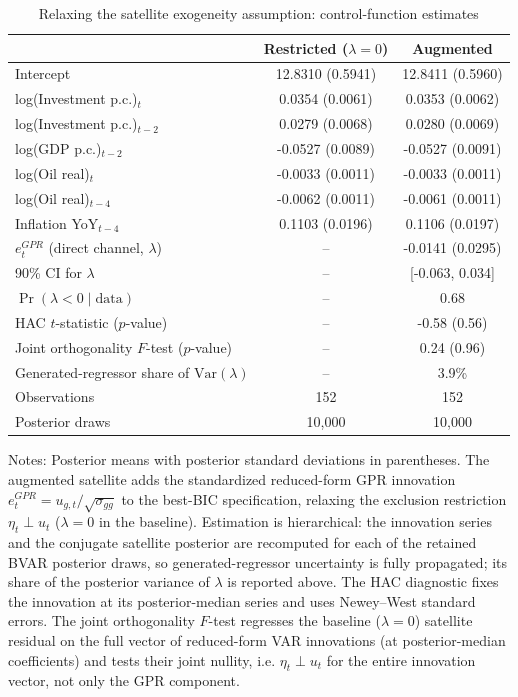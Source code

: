 \begin{table}[!htbp]
\centering
\caption{Relaxing the satellite exogeneity assumption: control-function estimates}
\label{tab:direct_channel_satellite}
\begin{tabular}{lcc}
\toprule
 & Restricted ($\lambda = 0$) & Augmented \\
\midrule
Intercept & 12.8310 (0.5941) & 12.8411 (0.5960) \\
log(Investment p.c.)$_{t}$ & 0.0354 (0.0061) & 0.0353 (0.0062) \\
log(Investment p.c.)$_{t-2}$ & 0.0279 (0.0068) & 0.0280 (0.0069) \\
log(GDP p.c.)$_{t-2}$ & -0.0527 (0.0089) & -0.0527 (0.0091) \\
log(Oil real)$_{t}$ & -0.0033 (0.0011) & -0.0033 (0.0011) \\
log(Oil real)$_{t-4}$ & -0.0062 (0.0011) & -0.0061 (0.0011) \\
Inflation YoY$_{t-4}$ & 0.1103 (0.0196) & 0.1106 (0.0197) \\
$e^{GPR}_{t}$ (direct channel, $\lambda$) & -- & -0.0141 (0.0295) \\
\midrule
90\% CI for $\lambda$ & -- & [-0.063, 0.034] \\
$\Pr(\lambda < 0 \mid \text{data})$ & -- & 0.68 \\
HAC $t$-statistic ($p$-value) & -- & -0.58 (0.56) \\
Joint orthogonality $F$-test ($p$-value) & -- & 0.24 (0.96) \\
Generated-regressor share of $\mathrm{Var}(\lambda)$ & -- & 3.9\% \\
Observations & 152 & 152 \\
Posterior draws & 10,000 & 10,000 \\
\bottomrule
\end{tabular}
\begin{tablenotes}
\small
\item Notes: Posterior means with posterior standard deviations in parentheses. The augmented satellite adds the standardized reduced-form GPR innovation $e^{GPR}_t = u_{g,t}/\sqrt{\sigma_{gg}}$ to the best-BIC specification, relaxing the exclusion restriction $\eta_t \perp u_t$ ($\lambda = 0$ in the baseline). Estimation is hierarchical: the innovation series and the conjugate satellite posterior are recomputed for each of the retained BVAR posterior draws, so generated-regressor uncertainty is fully propagated; its share of the posterior variance of $\lambda$ is reported above. The HAC diagnostic fixes the innovation at its posterior-median series and uses Newey--West standard errors. The joint orthogonality $F$-test regresses the baseline ($\lambda = 0$) satellite residual on the full vector of reduced-form VAR innovations (at posterior-median coefficients) and tests their joint nullity, i.e. $\eta_t \perp u_t$ for the entire innovation vector, not only the GPR component.
\end{tablenotes}
\end{table}
